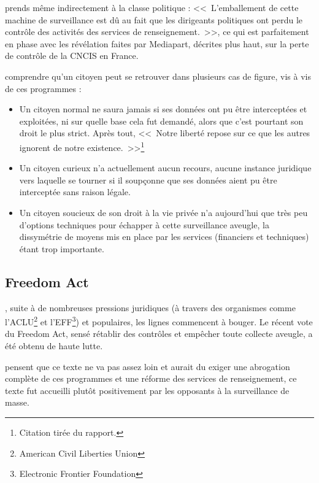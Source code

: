  prends même indirectement à la classe politique :
<<~L'emballement de cette machine de surveillance est dû au fait que les
dirigeants politiques ont perdu le contrôle des activités des services de
renseignement.~>>, ce qui est parfaitement en phase avec les révélation faites
par Mediapart, décrites plus haut, sur la perte de contrôle de la CNCIS en
France.

 comprendre qu'un citoyen peut se retrouver dans
plusieurs cas de figure, vis à vis de ces programmes :

\begin{itemize}
  \item Un citoyen normal ne saura jamais si ses données ont pu être
  interceptées et exploitées, ni sur quelle base cela fut demandé, alors que
  c'est pourtant son droit le plus strict. Après tout, <<~Notre liberté repose
  sur ce que les autres ignorent de notre existence.~>>\footnote{Citation tirée
  du rapport.}
  \item Un citoyen curieux n'a actuellement aucun recours, aucune instance
  juridique vers laquelle se tourner si il soupçonne que ses données aient pu
  être interceptée sans raison légale.
  \item Un citoyen soucieux de son droit à la vie privée n'a aujourd'hui que
  très peu d'options techniques pour échapper à cette surveillance aveugle, la
  dissymétrie de moyens mis en place par les services (financiers et techniques)
  étant trop importante.
\end{itemize}

\subsection{Freedom Act}

, suite à de nombreuses pressions juridiques (à travers des
organismes comme l'ACLU\footnote{American Civil Liberties Union} et
l'EFF\footnote{Electronic Frontier Foundation}) et populaires, les lignes
commencent à bouger. Le récent vote du Freedom Act, sensé rétablir des contrôles
et empêcher toute collecte aveugle, a été obtenu de haute
lutte\cite{freedom}.

 pensent que ce texte ne va pas assez loin et
aurait du exiger une abrogation complète de ces programmes et une réforme des services de
renseignement, ce texte fut accueilli plutôt positivement par les opposants à la
surveillance de masse.


